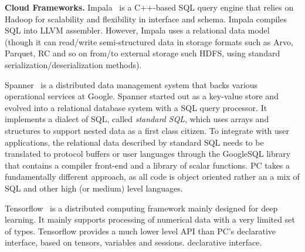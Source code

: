 \vspace{5pt} 
\noindent
\textbf{Cloud Frameworks.} Impala~\cite{bittorf2015impala} is a
C++-based 
SQL query engine that relies on Hadoop for scalability and 
flexibility in interface and schema. Impala compiles SQL 
into LLVM assembler.
However,
Impala uses a relational data model (though it can read/write
semi-structured data in storage formats such as Arvo, Parquet, RC and so
on from/to external storage such HDFS, using standard
serialization/deserialization methods).

Spanner~\cite{bacon2017spanner} is a
distributed data management system that backs various operational services
at Google. Spanner started out as a key-value store and evolved into a
relational database system with a SQL query processor. It implements a
dialect of SQL, called \emph{standard SQL}, which uses arrays and structures to
support nested data as a first class citizen. To integrate
with user applications, the relational data described by standard SQL needs to
be translated to protocol buffers or user languages through the
GoogleSQL library that contains a compiler front-end and a library of
scalar functions. PC takes a fundamentally different approach, as all code is 
object oriented rather an a mix of SQL and other high (or medium) level languages.

Tensorflow~\cite{abadi2016tensorflow} is a
distributed computing framework mainly designed for deep learning. It
mainly supports processing of numerical data with a
very limited set of types.
Tensorflow provides
a much lower level API than PC's declarative interface, based on tensors,
variables and sessions.
declarative interface. 


